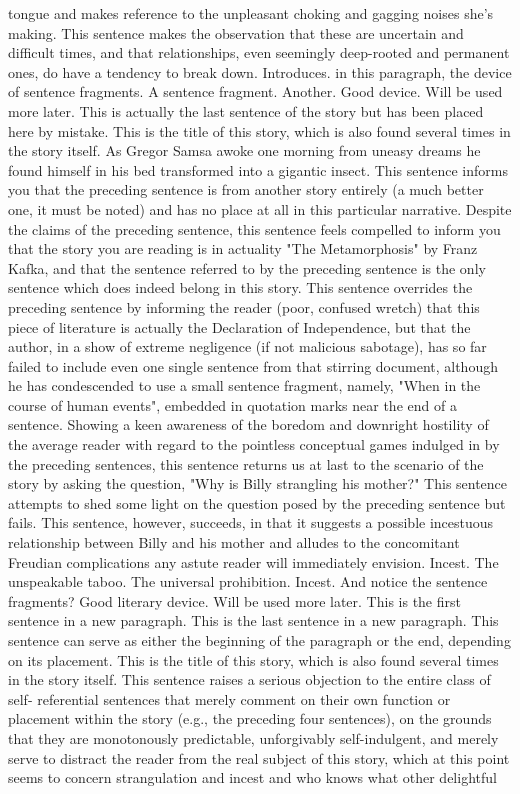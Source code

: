 tongue and makes reference to the unpleasant choking and gagging noises she's making. This sentence makes the observation that these are uncertain and difficult times, and that relationships, even seemingly deep-rooted and permanent ones, do have a tendency to break down. Introduces. in this paragraph, the device of sentence fragments. A sentence fragment. Another. Good device. Will be used more later. This is actually the last sentence of the story but has been placed here by mistake. This is the title of this story, which is also found several times in the story itself. As Gregor Samsa awoke one morning from uneasy dreams he found himself in his bed transformed into a gigantic insect. This sentence informs you that the preceding sentence is from another story entirely (a much better one, it must be noted) and has no place at all in this particular narrative. Despite the claims of the preceding sentence, this sentence feels compelled to inform you that the story you are reading is in actuality "The Metamorphosis" by Franz Kafka, and that the sentence referred to by the preceding sentence is the only sentence which does indeed belong in this story. This sentence overrides the preceding sentence by informing the reader (poor, confused wretch) that this piece of literature is actually the Declaration of Independence, but that the author, in a show of extreme negligence (if not malicious sabotage), has so far failed to include even one single sentence from that stirring document, although he has condescended to use a small sentence fragment, namely, "When in the course of human events", embedded in quotation marks near the end of a sentence. Showing a keen awareness of the boredom and downright hostility of the average reader with regard to the pointless conceptual games indulged in by the preceding sentences, this sentence returns us at last to the scenario of the story by asking the question, "Why is Billy strangling his mother?" This sentence attempts to shed some light on the question posed by the preceding sentence but fails. This sentence, however, succeeds, in that it suggests a possible incestuous relationship between Billy and his mother and alludes to the concomitant Freudian complications any astute reader will immediately envision. Incest. The unspeakable taboo. The universal prohibition. Incest. And notice the sentence fragments? Good literary device. Will be used more later. This is the first sentence in a new paragraph. This is the last sentence in a new paragraph. This sentence can serve as either the beginning of the paragraph or the end, depending on its placement. This is the title of this story, which is also found several times in the story itself. This sentence raises a serious objection to the entire class of self- referential sentences that merely comment on their own function or placement within the story (e.g., the preceding four sentences), on the grounds that they are monotonously predictable, unforgivably self-indulgent, and merely serve to distract the reader from the real subject of this story, which at this point seems to concern strangulation and incest and who knows what other delightful 



